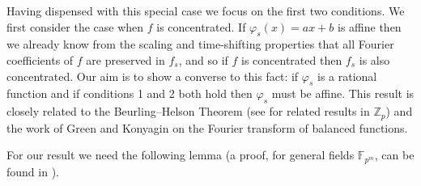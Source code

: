 \documentclass[11pt]{article}
\newtheorem{lemma}[theorem]{Lemma}
\theoremstyle{definition}
\newcommand{\F}{{\mathbb{F}}}
\newcommand{\Z}{\mathbb{Z}}
\begin{document}
Having dispensed with this special case we focus on the first two conditions.
We first consider the case when $f$ is concentrated.
If $\varphi_s(x) = ax + b$ is affine then we already know from the scaling and time-shifting properties that all Fourier coefficients of $f$ are preserved in $f_s$, and so if $f$ is concentrated then $f_s$ is also concentrated.
Our aim is to show a converse to this fact: if $\varphi_s$ is a rational function and if conditions 1 and 2 both hold then $\varphi_s$ must be affine.
This result is closely related to the Beurling--Helson Theorem \cite{Beur-Hel} (see \cite{KonShk,Lebedev} for related results in $\Z_p$) and the work of Green and Konyagin \cite{GreKon} on the Fourier transform of balanced functions.

For our result we need the following lemma \cite[Lemma 7]{NguShpa} (a proof, for general fields $\F_{p^m}$, can be found in  \cite[Theorem 2]{Moreno}).

\end{document}
